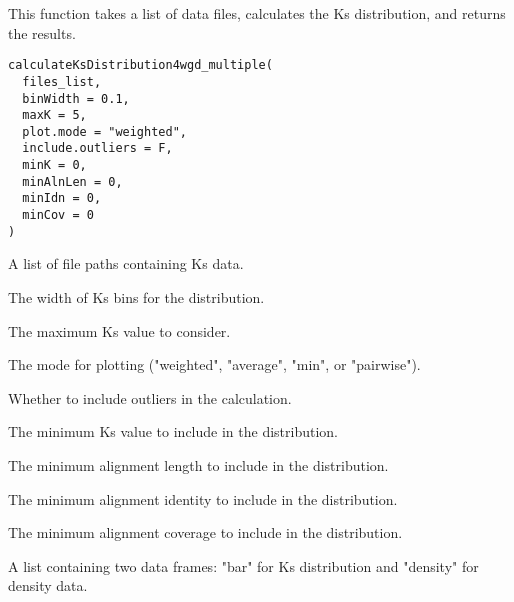 \documentclass[a4paper]{book}
\begin{document}
%
\begin{Description}\relax
This function takes a list of data files, calculates the Ks distribution, and returns the results.
\end{Description}
%
\begin{Usage}
\begin{verbatim}
calculateKsDistribution4wgd_multiple(
  files_list,
  binWidth = 0.1,
  maxK = 5,
  plot.mode = "weighted",
  include.outliers = F,
  minK = 0,
  minAlnLen = 0,
  minIdn = 0,
  minCov = 0
)
\end{verbatim}
\end{Usage}
%
\begin{Arguments}
\begin{ldescription}
\item[\code{files\_list}] A list of file paths containing Ks data.

\item[\code{binWidth}] The width of Ks bins for the distribution.

\item[\code{maxK}] The maximum Ks value to consider.

\item[\code{plot.mode}] The mode for plotting ("weighted", "average", "min", or "pairwise").

\item[\code{include.outliers}] Whether to include outliers in the calculation.

\item[\code{minK}] The minimum Ks value to include in the distribution.

\item[\code{minAlnLen}] The minimum alignment length to include in the distribution.

\item[\code{minIdn}] The minimum alignment identity to include in the distribution.

\item[\code{minCov}] The minimum alignment coverage to include in the distribution.
\end{ldescription}
\end{Arguments}
%
\begin{Value}
A list containing two data frames: "bar" for Ks distribution and "density" for density data.
\end{Value}
\end{document}
